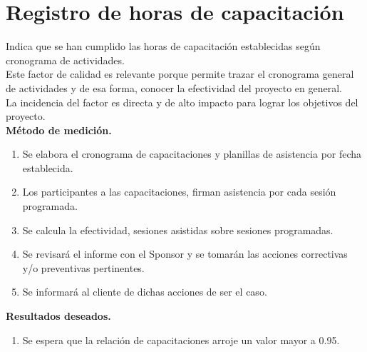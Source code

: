 \section{Registro de horas de capacitaci\'on}
%
Indica que se han cumplido las horas de capacitaci\'on establecidas seg\'un cronograma de actividades.\\%
%
Este factor de calidad es relevante porque permite trazar el cronograma general de actividades y de esa forma,
conocer la efectividad del proyecto en general.\\
%
La incidencia del factor es directa y de alto impacto para lograr los objetivos del proyecto.\\[0.5cm]%
%
\textbf{M\'etodo de medici\'on.}
%
\begin{enumerate}
	\item Se elabora el cronograma de capacitaciones y planillas de asistencia por fecha establecida.
	\item Los participantes a las capacitaciones, firman asistencia por cada sesi\'on programada.
	\item Se calcula la efectividad, sesiones asistidas sobre sesiones programadas.
	\item Se revisar\'a el informe con el Sponsor y se tomar\'an las acciones correctivas y/o preventivas
		pertinentes.
	\item Se informar\'a al cliente de dichas acciones de ser el caso.
\end{enumerate}
%
\textbf{Resultados deseados.}
%
\begin{enumerate}
	\item Se espera que la relaci\'on de capacitaciones arroje un valor mayor a 0.95.
\end{enumerate}